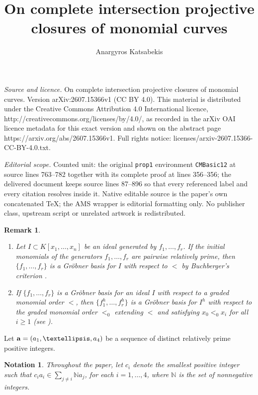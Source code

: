 \documentclass[10pt,a4paper]{amsart}
\newtheorem{rem1}[thm1]{Remark}
\newtheorem{not1}[thm1]{Notation}
\begin{document}
\title[On complete intersection projective closures of monomial cur]{On complete intersection projective closures of monomial curves}
\author{Anargyros Katsabekis}
\date{}
\maketitle
\noindent\emph{Source and licence.} On complete intersection projective closures of monomial curves. Version arXiv:2607.15366v1 (CC BY 4.0). This material is distributed under the Creative Commons Attribution 4.0 International licence, http://creativecommons.org/licenses/by/4.0/, as recorded in the arXiv OAI licence metadata for this exact version and shown on the abstract page https://arxiv.org/abs/2607.15366v1. Full rights notice: licenses/arxiv-2607.15366-CC-BY-4.0.txt.\par\smallskip
\noindent\textit{Editorial scope.} Counted unit: the original \texttt{prop1} environment \texttt{CMBasic12} at source lines 763--782 together with its complete proof at lines 356--356; the delivered document keeps source lines 87--896 so that every referenced label and every citation resolves inside it. Native editable source is the paper's own concatenated TeX; the AMS wrapper is editorial formatting only. No publisher class, upstream script or unrelated artwork is redistributed.
\begin{rem1}\label{VeryBasicRemark} {\rm \begin{enumerate} \item Let $I\subset K[x_1,\ldots,x_n]$ be an ideal generated by $f_1,\ldots,f_r$. If the initial monomials of the generators
$f_1,\ldots,f_r$
are pairwise relatively prime, then $\{f_1,\ldots,f_r\}$ is a Gr\"obner basis for $I$ with respect to $<$ by Buchberger's criterion \cite[Proposition~4, Chapter~2]{CLO}. \item If $\{f_1,\ldots,f_r\}$ is a Gr\"obner basis for an ideal $I$ with respect to a graded monomial order $<$, then $\{f_1^h,\ldots,f_r^h\}$ is a Gr\"obner basis for $I^h$ with respect to the graded monomial order $<_0$ extending $<$ and satisfying $x_0<_0x_i$ for all $i\ge1$ (see \cite[Chapter~8]{CLO}). \end{enumerate} } \end{rem1}

Let ${\bf a}=(a_1,\ldots,a_4)$ be a sequence of distinct relatively prime positive integers. 
\begin{not1} {\rm Throughout the paper, let $c_i$ denote the smallest positive integer such that $c_{i}a_{i} \in \sum_{j \neq i} \mathbb{N}a_{j}$, for each $i=1,\ldots,4$, where $\mathbb{N}$ is the set of nonnegative integers.}
\end{not1}
\end{document}
